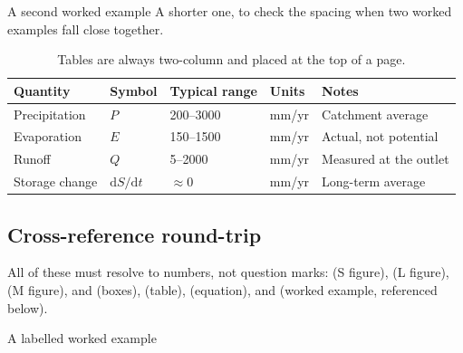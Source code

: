 \lipsum[35]

\begin{workedexample}{A second worked example}
 A shorter one, to check the spacing when two worked
examples fall close together.

 \lipsum[36]
\end{workedexample}

\lipsum[37-38]

\begin{table}[t]
\caption{Tables are always two-column and placed at the top of a page.}
\label{tab:mock-ch1}
\sffamily\scriptsize
\begin{tabular}{p{} p{} p{} p{} p{}}
\toprule
\textbf{Quantity} & \textbf{Symbol} & \textbf{Typical range} &
\textbf{Units} & \textbf{Notes} \\
\midrule
Precipitation & $P$ & 200--3000 & mm/yr & Catchment average \\
\addlinespace
Evaporation & $E$ & 150--1500 & mm/yr & Actual, not potential \\
\addlinespace
Runoff & $Q$ & 5--2000 & mm/yr & Measured at the outlet \\
\addlinespace
Storage change & $\mathrm{d}S/\mathrm{d}t$ & $\approx 0$ & mm/yr &
Long-term average \\
\bottomrule
\end{tabular}
\end{table}

\lipsum[39-40]

\subsection{Cross-reference round-trip}

All of these must resolve to numbers, not question marks:
 (S figure),
 (L figure),
 (M figure),
 and  (boxes),
 (table),
 (equation), and
 (worked example, referenced below).

\begin{workedexample}{A labelled worked example}
\label{wex:mock}
\lipsum[41]
\end{workedexample}

